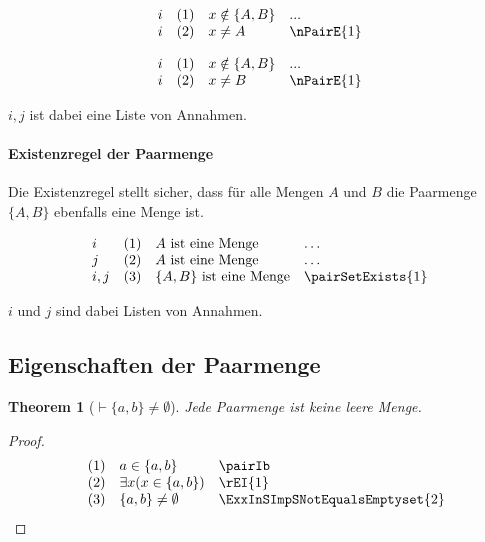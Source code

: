 \documentclass{book}
\theoremstyle{plain}
\newtheorem{theorem}{Theorem}
\theoremstyle{remark}
\theoremstyle{definition}
\begin{document}
\[
\begin{array}{llll}
	i & (1) & x \notin \{A,B\} & ... \\
	i & (2) & x \neq A  & \nPairE{1} \\
\end{array}
\]

\[
\begin{array}{llll}
	i & (1) & x \notin \{A,B\} & ... \\
	i & (2) & x \neq B  & \nPairE{1} \\
\end{array}
\]


\(i,j\) ist dabei eine Liste von Annahmen.

\paragraph{Existenzregel der Paarmenge}
\label{rule:pairSetExists}
Die Existenzregel stellt sicher, dass für alle Mengen \(A\) und \(B\) die Paarmenge \(\{A, B\}\) ebenfalls eine Menge ist.

\[
\begin{array}{llll}
	i & (1) & A \text{ ist eine Menge} & \dots  \\
        j & (2) & A \text{ ist eine Menge} & \dots  \\
	i,j & (3) & \{A, B\}\text{ ist eine Menge} & \pairSetExists{1} \\
\end{array}
\]

\(i\) und \(j\) sind dabei Listen von Annahmen.


\subsection{Eigenschaften der Paarmenge}

\label{ImpLbawbRbNotEqualsEmptyset}
\begin{theorem}[\(\vdash \{a,b\}\neq\emptyset\)]
	Jede Paarmenge ist keine leere Menge.
\end{theorem}
\begin{proof}
	\[
	\begin{array}{llll}
		& (1) & a\in \{a,b\} & \pairIb \\
		& (2) & \exists x(x\in \{a,b\}) & \rEI{1}  \\
		& (3) & \{a,b\}\neq\emptyset & \ExxInSImpSNotEqualsEmptyset{2}  \\
	\end{array}
	\]	
\end{proof}
\end{document}
